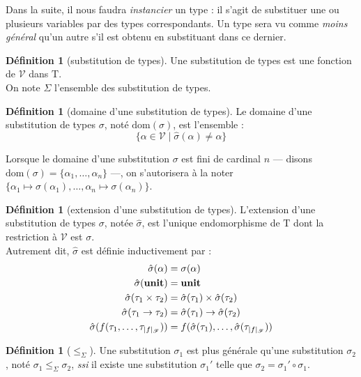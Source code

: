 \documentclass[a4paper]{report}
\theoremstyle{definition}
\newtheorem{definition}[theoreme]{Définition}
\newcommand{\ssi}{\textit{ssi}\xspace}
\newcommand{\unit}{\bold{unit}}
\newcommand{\V}{\mathscr{V}}
\newcommand{\F}{\mathscr{F}}
\newcommand{\T}{\mathrm{T}}
\begin{document}
Dans la suite, il nous faudra \emph{instancier} un type : il s'agit de substituer une ou plusieurs variables par des types correspondants. Un type sera vu comme \emph{moins général} qu'un autre s'il est obtenu en substituant dans ce dernier.

\begin{definition}[substitution de types]
	Une substitution de types est une fonction de $\V$ dans $\T$. \\
	On note $\Sigma$ l'ensemble des substitution de types.
\end{definition}

\begin{definition}[domaine d'une substitution de types]
	Le domaine d'une substitution de types $\sigma$, noté $\mathrm{dom} (\sigma)$, est l'ensemble :
	\[ \{ \alpha \in \V \mid \hat\sigma (\alpha) \neq \alpha \} \]
\end{definition}

Lorsque le domaine d'une substitution $\sigma$ est fini de cardinal $n$ — disons $\mathrm{dom} (\sigma) = \{ \alpha_1, \dots, \alpha_n \}$ —, on s'autorisera à la noter $\{ \alpha_1 \mapsto \sigma (\alpha_1), \dots, \alpha_n \mapsto \sigma (\alpha_n) \}$.

\begin{definition}[extension d'une substitution de types]
	L'extension d'une substitution de types $\sigma$, notée $\hat\sigma$, est l'unique endomorphisme de $\T$ dont la restriction à $\V$ est $\sigma$. \\
	Autrement dit, $\hat\sigma$ est définie inductivement par :
	\begin{align*}
			\hat\sigma (\alpha) &=
			\sigma (\alpha)
		\\
			\hat\sigma (\unit) &=
			\unit
		\\
			\hat\sigma (\tau_1 \times \tau_2) &=
			\hat\sigma (\tau_1) \times \hat\sigma (\tau_2)
		\\
			\hat\sigma (\tau_1 \rightarrow \tau_2) &=
			\hat\sigma (\tau_1) \rightarrow \hat\sigma (\tau_2)
		\\
			\hat\sigma (f (\tau_1, \dots, \tau_{|f|_\F})) &=
			f (\hat\sigma (\tau_1), \dots, \hat\sigma (\tau_{|f|_\F}))
	\end{align*}
\end{definition}

\begin{definition}[$\leqslant_\Sigma$]
	Une substitution $\sigma_1$ est plus générale qu'une substitution $\sigma_2$, noté $\sigma_1 \leqslant_\Sigma \sigma_2$, \ssi il existe une substitution $\sigma_1'$ telle que $\sigma_2 = \sigma_1' \circ \sigma_1$.
\end{definition}
\end{document}
